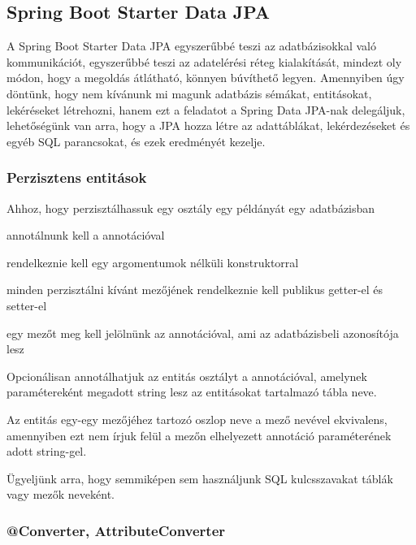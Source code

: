 \subsection{Spring Boot Starter Data JPA}

A Spring Boot Starter Data JPA egyszerűbbé teszi az adatbázisokkal való kommunikációt, egyszerűbbé teszi az adatelérési réteg kialakítását, mindezt oly módon, hogy a megoldás átlátható, könnyen búvíthető legyen. Amennyiben úgy döntünk, hogy nem kívánunk mi magunk adatbázis sémákat, entitásokat, lekéréseket létrehozni, hanem ezt a feladatot a Spring Data JPA-nak delegáljuk, lehetőségünk van arra, hogy a JPA hozza létre az adattáblákat, lekérdezéseket és egyéb SQL parancsokat, és ezek eredményét kezelje.

\subsubsection{Perzisztens entitások}

Ahhoz, hogy perzisztálhassuk egy osztály egy példányát egy adatbázisban 

\begin{listing}
	\item annotálnunk kell a  annotációval
	\item rendelkeznie kell egy argomentumok nélküli konstruktorral
	\item minden perzisztálni kívánt mezőjének rendelkeznie kell publikus getter-el és setter-el
	\item egy mezőt meg kell jelölnünk az  annotációval, ami az adatbázisbeli azonosítója lesz
\end{listing}

Opcionálisan annotálhatjuk az entitás osztályt a  annotációval, amelynek  paramétereként megadott string lesz az entitásokat tartalmazó tábla neve. \par

Az entitás egy-egy mezőjéhez tartozó oszlop neve a mező nevével ekvivalens, amennyiben ezt nem írjuk felül a mezőn elhelyezett  annotáció  paraméterének adott string-gel. \par

Ügyeljünk arra, hogy semmiképen sem használjunk SQL kulcsszavakat táblák vagy mezők neveként.

\subsubsection{@Converter, AttributeConverter}

